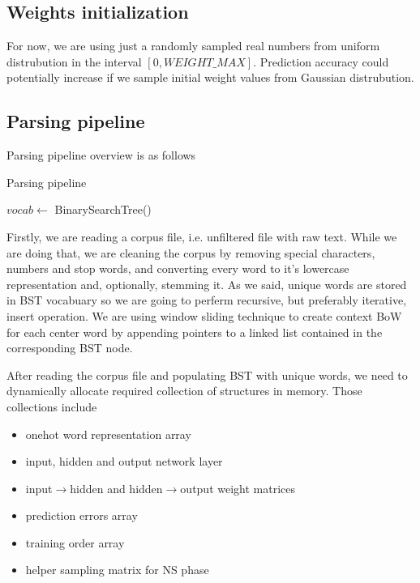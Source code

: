 \documentclass{article}
\newcommand{\SetAlgoStyle}{
	\SetAlgoNoLine
	\SetAlgoNoEnd
	\DontPrintSemicolon
}
\begin{document}
\subsection{Weights initialization}

For now, we are using just a randomly sampled real numbers from uniform distrubution in the interval
$[0, WEIGHT\_MAX]$. Prediction accuracy could potentially increase if we sample initial
weight values from Gaussian distrubution.

\subsection{Parsing pipeline}

Parsing pipeline overview is as follows

\begin{algorithm}[H]
	\caption{Parsing pipeline}
	\SetAlgoStyle
	$vocab \gets$ BinarySearchTree()\;
\end{algorithm}

Firstly, we are reading a corpus file, i.e. unfiltered file with raw
text. While we are doing that, we are cleaning the corpus by removing special
characters, numbers and stop words, and converting every word to it's
lowercase representation and, optionally, stemming it. As we said, unique words are stored in BST
vocabuary so we are going to perferm recursive, but preferably iterative,
insert operation. We are using window sliding technique to create context BoW 
for each center word by appending pointers to a linked list contained in the
corresponding BST node.

\medbreak

After reading the corpus file and populating BST with unique words, we need to
dynamically allocate required collection of structures in memory. Those
collections include

\begin{itemize}
	\item onehot word representation array
	\item input, hidden and output network layer
	\item input$\rightarrow$hidden and hidden$\rightarrow$output weight matrices
	\item prediction errors array
	\item training order array
	\item helper sampling matrix for NS phase
\end{itemize}
\end{document}
